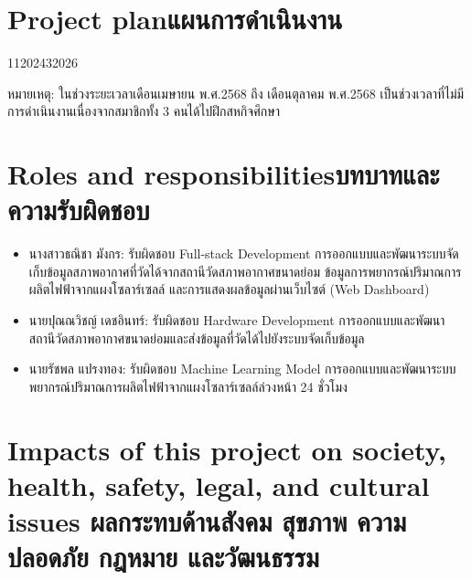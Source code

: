\section{\ifenglish Project plan\else แผนการดำเนินงาน\fi}



\begin{plan}{11}{2024}{3}{2026}
    \caption{แผนการดำเนินโครงงาน}
\end{plan}


หมายเหตุ: ในช่วงระยะเวลาเดือนเมษายน พ.ศ.2568 ถึง เดือนตุลาคม พ.ศ.2568 เป็นช่วงเวลาที่ไม่มีการดำเนินงานเนื่องจากสมาชิกทั้ง 3 คนได้ไปฝึกสหกิจศึกษา

\section{\ifenglish Roles and responsibilities\else บทบาทและความรับผิดชอบ\fi}
\begin{itemize}
    \item[1.] นางสาวธณิชา มังกร: รับผิดชอบ Full-stack Development การออกแบบและพัฒนาระบบจัดเก็บข้อมูลสภาพอากาศที่วัดได้จากสถานีวัดสภาพอากาศขนาดย่อม ข้อมูลการพยากรณ์ปริมาณการผลิตไฟฟ้าจากแผงโซลาร์เซลล์  และการแสดงผลข้อมูลผ่านเว็บไซต์ (Web Dashboard)
    \item[2.] นายปุณณวิชญ์ เดชอินทร์: รับผิดชอบ Hardware Development การออกแบบและพัฒนาสถานีวัดสภาพอากาศขนาดย่อมและส่งข้อมูลที่วัดได้ไปยังระบบจัดเก็บข้อมูล
    \item[3.] นายรัชพล แปรงทอง: รับผิดชอบ Machine Learning Model การออกแบบและพัฒนาระบบพยากรณ์ปริมาณการผลิตไฟฟ้าจากแผงโซลาร์เซลล์ล่วงหน้า 24 ชั่วโมง
\end{itemize}

\section{\ifenglish%
Impacts of this project on society, health, safety, legal, and cultural issues
\else%
ผลกระทบด้านสังคม สุขภาพ ความปลอดภัย กฎหมาย และวัฒนธรรม
\fi}

